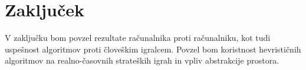 \documentclass[a4paper, 12pt]{book}
\begin{document}
\chapter{Zaključek}
V zaključku bom povzel rezultate računalnika proti računalniku, kot tudi uspešnost algoritmov proti človeškim igralcem.
Povzel bom koristnost hevrističnih algoritmov na realno-časovnih strateških igrah in vpliv abstrakcije prostora.


\newpage %
\ \\
\clearpage
{}


\end{document}
